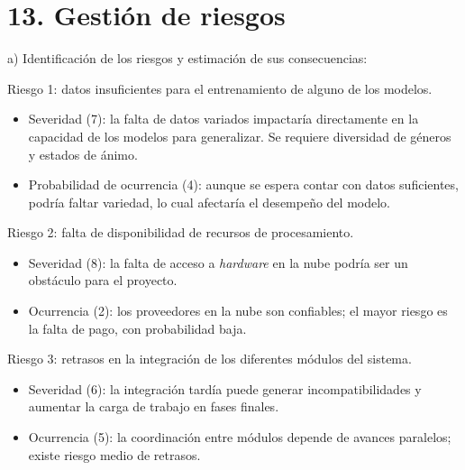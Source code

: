 \documentclass[
11pt, %
]{charter}
\begin{document}

\section{13. Gestión de riesgos}
\label{sec:riesgos}

a) Identificación de los riesgos y estimación de sus consecuencias:
 
Riesgo 1: datos insuficientes para el entrenamiento de alguno de los modelos.
\begin{itemize}
	\item Severidad (7): la falta de datos variados impactaría directamente en la capacidad de los modelos para generalizar. Se requiere diversidad de géneros y estados de ánimo.
	\item Probabilidad de ocurrencia (4): aunque se espera contar con datos suficientes, podría faltar variedad, lo cual afectaría el desempeño del modelo. 
\end{itemize}   

Riesgo 2: falta de disponibilidad de recursos de procesamiento.
\begin{itemize}
	\item Severidad (8): la falta de acceso a \textit{hardware} en la nube podría ser un obstáculo para el proyecto.
	\item Ocurrencia (2): los proveedores en la nube son confiables; el mayor riesgo es la falta de pago, con probabilidad baja.
\end{itemize}

Riesgo 3: retrasos en la integración de los diferentes módulos del sistema.
\begin{itemize}
	\item Severidad (6): la integración tardía puede generar incompatibilidades y aumentar la carga de trabajo en fases finales.
	\item Ocurrencia (5): la coordinación entre módulos depende de avances paralelos; existe riesgo medio de retrasos.
\end{itemize}
\end{document}
